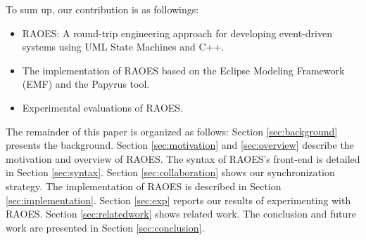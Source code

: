 To sum up, our contribution is as followings:
\begin{itemize}
	\item RAOES: A round-trip engineering approach for developing event-driven systems using UML State Machines and C++.
	\item The implementation of RAOES based on the Eclipse Modeling Framework (EMF) and the Papyrus tool.
	\item Experimental evaluations of RAOES.
\end{itemize}

The remainder of this paper is organized as follows: Section \ref{sec:background} presents the background. 
Section \ref{sec:motivation} and \ref{sec:overview} describe the motivation and overview of RAOES. 
The syntax of RAOES's front-end is detailed in Section \ref{sec:syntax}.
Section \ref{sec:collaboration} shows our synchronization strategy.
The implementation of RAOES is described in Section \ref{sec:implementation}. 
Section \ref{sec:exp} reports our results of experimenting with RAOES. 
Section \ref{sec:relatedwork} shows related work. 
The conclusion and future work are presented in Section \ref{sec:conclusion}.

